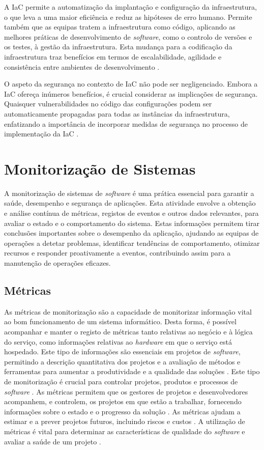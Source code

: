 A \ac{IaC} permite a automatização da implantação e configuração da infraestrutura, o que leva a 
uma maior eficiência e reduz as hipóteses de erro humano. Permite também que as equipas tratem a 
infraestrutura como código, aplicando as melhores práticas de desenvolvimento de \textit{software}, 
como o controlo de versões e os testes, à gestão da infraestrutura. Esta mudança para a codificação 
da infraestrutura traz benefícios em termos de escalabilidade, agilidade e consistência entre 
ambientes de desenvolvimento \cite{iac2023b}.

O aspeto da segurança no contexto de \ac{IaC} não pode ser negligenciado. Embora a \ac{IaC} 
ofereça inúmeros benefícios, é crucial considerar as implicações de segurança. Quaisquer 
vulnerabilidades no código das configurações podem ser automaticamente propagadas para todas as 
instâncias da infraestrutura, enfatizando a importância de incorporar medidas de segurança no 
processo de implementação da \ac{IaC} \cite{iac2023}.

\section{Monitorização de Sistemas}

A monitorização de sistemas de \textit{software} é uma prática essencial para garantir a saúde, 
desempenho e segurança de aplicações. Esta atividade envolve a obtenção e análise contínua de métricas, 
registos de eventos e outros dados relevantes, para avaliar o estado e o comportamento 
do sistema. Estas informações permitem tirar conclusões importantes sobre o desempenho da aplicação, 
ajudando as equipas de operações a detetar problemas, identificar tendências de comportamento, 
otimizar recursos e responder proativamente a eventos, contribuindo assim para a manutenção de 
operações eficazes.

\subsection{Métricas}

As métricas de monitorização são a capacidade de monitorizar informação vital ao bom funcionamento
de um sistema informático. Desta forma, é possível acompanhar e manter o registo de métricas tanto
relativas ao negócio e à lógica do serviço, como informações relativas ao \textit{hardware} em que
o serviço está hospedado. Este tipo de informações são essenciais em projetos de \textit{software}, 
permitindo a descrição quantitativa dos projetos e a avaliação de métodos e ferramentas para 
aumentar a produtividade e a qualidade das soluções \cite{metrics2003}. Este tipo de monitorização 
é crucial para controlar projetos, produtos e processos de \textit{software} \cite{metrics2019}. 
As métricas permitem que os gestores de projetos e desenvolvedores acompanhem, e controlem, os 
projetos em que estão a trabalhar, fornecendo informações sobre o estado e o progresso da solução 
\cite{metrics2016}. As métricas ajudam a estimar e a prever projetos futuros, incluindo riscos e 
custos \cite{metrics2016b}. A utilização de métricas é vital para determinar as características de 
qualidade do \textit{software} e avaliar a saúde de um projeto \cite{metrics2015}.

